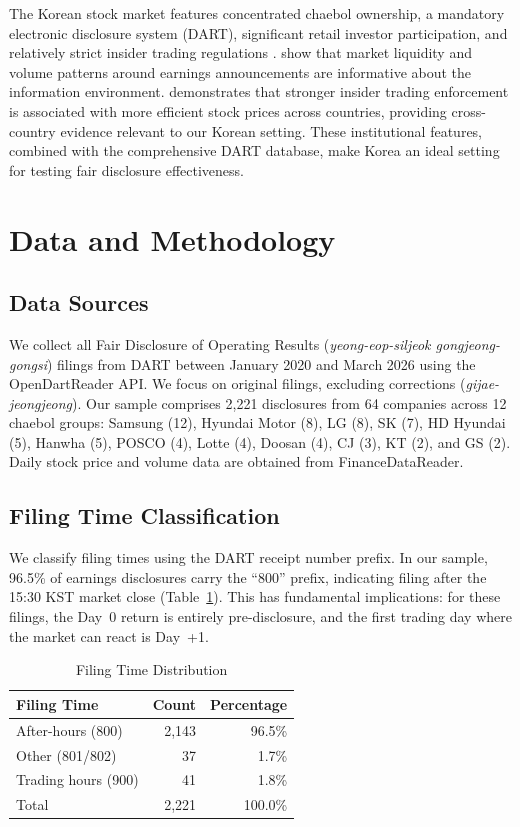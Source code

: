 \documentclass[review,authoryear]{elsarticle}
\begin{document}
The Korean stock market features concentrated chaebol ownership, a mandatory electronic disclosure system (DART), significant retail investor participation, and relatively strict insider trading regulations \citep{lee2019regulation}. \citet{kim2002market} show that market liquidity and volume patterns around earnings announcements are informative about the information environment. \citet{beny2005impact} demonstrates that stronger insider trading enforcement is associated with more efficient stock prices across countries, providing cross-country evidence relevant to our Korean setting. These institutional features, combined with the comprehensive DART database, make Korea an ideal setting for testing fair disclosure effectiveness.

\section{Data and Methodology}
\label{sec:data}

\subsection{Data Sources}

We collect all Fair Disclosure of Operating Results (\textit{yeong-eop-siljeok gongjeong-gongsi}) filings from DART between January 2020 and March 2026 using the OpenDartReader API. We focus on original filings, excluding corrections (\textit{gijae-jeongjeong}). Our sample comprises 2,221 disclosures from 64 companies across 12 chaebol groups: Samsung (12), Hyundai Motor (8), LG (8), SK (7), HD Hyundai (5), Hanwha (5), POSCO (4), Lotte (4), Doosan (4), CJ (3), KT (2), and GS (2). Daily stock price and volume data are obtained from FinanceDataReader.

\subsection{Filing Time Classification}

We classify filing times using the DART receipt number prefix. In our sample, 96.5\% of earnings disclosures carry the ``800'' prefix, indicating filing after the 15:30 KST market close (Table~\ref{tab:filing_time}). This has fundamental implications: for these filings, the Day~0 return is entirely pre-disclosure, and the first trading day where the market can react is Day~+1.

\begin{table}[H]
\centering
\caption{Filing Time Distribution}
\label{tab:filing_time}
\begin{tabular}{lrr}
\toprule
Filing Time & Count & Percentage \\
\midrule
After-hours (800) & 2,143 & 96.5\% \\
Other (801/802) & 37 & 1.7\% \\
Trading hours (900) & 41 & 1.8\% \\
\midrule
Total & 2,221 & 100.0\% \\
\bottomrule
\end{tabular}
\end{table}
\end{document}
